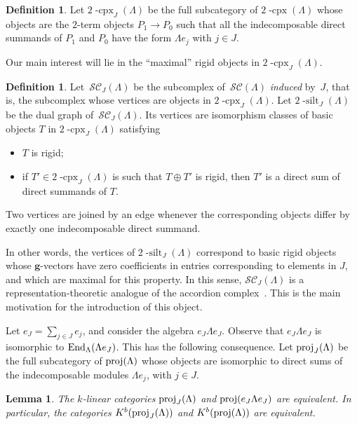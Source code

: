 \documentclass{amsart}
\newtheorem{lemma}[theorem]{Lemma}
\theoremstyle{definition}
\newtheorem{definition}[theorem]{Definition}
\renewcommand{\b}[1]{\mathbf{#1}} %
\newcommand{\darkblue}{\color{darkblue}} %
\newcommand{\defn}[1]{\textsl{\darkblue #1}} %
\newcommand{\cpx}{2 \! \operatorname{-cpx}}
\newcommand{\silt}{2 \! \operatorname{-silt}}
\newcommand{\siltingComplex}{\mathcal{SC}}
\newcommand{\proj}{\operatorname{{\rm proj }}}
\newcommand{\End}[1]{\operatorname{\rm End}_{#1}}
\begin{document}
\begin{definition}
Let $\cpx_J(\Lambda)$ be the full subcategory of $\cpx(\Lambda)$ whose objects are the $2$-term objects $P_1\to P_0$ such that all the indecomposable direct summands of $P_1$ and $P_0$ have the form $\Lambda e_j$ with $j\in J$.
\end{definition}

Our main interest will lie in the ``maximal'' rigid objects in $\cpx_J(\Lambda)$.

\begin{definition}
Let~$\siltingComplex_J(\Lambda)$ be the subcomplex of~$\siltingComplex(\Lambda)$ \defn{induced} by~$J$, that is, the subcomplex whose vertices are objects in $\cpx_J(\Lambda)$.
Let $\silt_J(\Lambda)$ be the dual graph of~$\siltingComplex_J(\Lambda)$.
Its vertices are isomorphism classes of basic objects $T$ in $\cpx_J(\Lambda)$ satisfying
\begin{itemize}
\item $T$ is rigid;
\item if $T'\in \cpx_J(\Lambda)$ is such that $T\oplus T'$ is rigid, then $T'$ is a direct sum of direct summands of $T$.
\end{itemize}
Two vertices are joined by an edge whenever the corresponding objects differ by exactly one indecomposable direct summand.
\end{definition}

In other words, the vertices of $\silt_J(\Lambda)$ correspond to basic rigid objects whose $\b{g}$-vectors have zero coefficients in entries 
corresponding to elements in $J$, and which are maximal for this property.
In this sense, $\siltingComplex_J(\Lambda)$ is a representation-theoretic analogue of the accordion complex~\cite{Chapoton-quadrangulations, GarverMcConville, MannevillePilaud-accordion}.
This is the main motivation for the introduction of this object.

Let $e_J = \sum_{j\in J} e_j$, and consider the algebra $e_J \Lambda e_J$.  
Observe that $e_J \Lambda e_J$ is isomorphic to $\End{\Lambda}(\Lambda e_J)$.  This has the following consequence.
Let $\proj_J(\Lambda)$ be the full subcategory of $\proj(\Lambda)$ whose objects are isomorphic to direct sums of
the indecomposable modules $\Lambda e_j$, with $j\in J$.

\begin{lemma}
 The $k$-linear categories $\proj_J(\Lambda)$ and $\proj(e_J\Lambda e_J)$ are equivalent.
 In particular, the categories $K^b(\proj_J(\Lambda))$ and $K^b(\proj(\Lambda))$ are equivalent.
\end{lemma}
\end{document}
